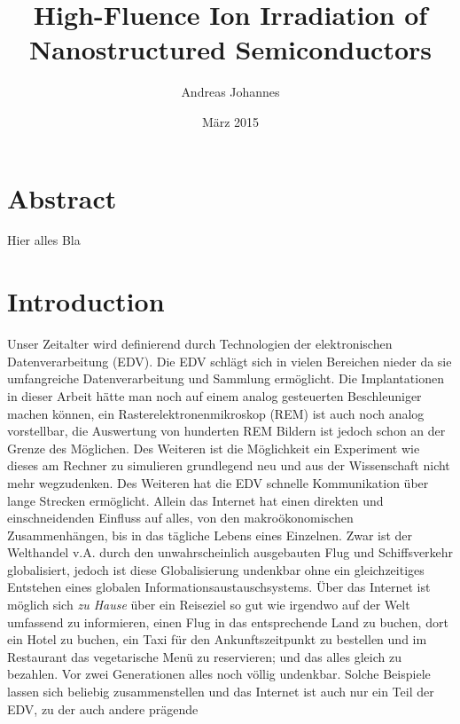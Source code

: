 \documentclass[11pt,
paper=a4,				
DIV=calc,		  %
headinclude,
]{scrbook}
\begin{document}
\titlehead{Friedrich Schiller Universität Jena\\
PAF}
\subject{Dissertation}
\title{High-Fluence Ion Irradiation of Nanostructured Semiconductors}
\author{Andreas Johannes}
\date{März 2015}
\maketitle



\chapter*{Abstract}

Hier alles Bla


\tableofcontents

\chapter{Introduction}


Unser Zeitalter wird definierend durch Technologien der elektronischen Datenverarbeitung (EDV). Die EDV schlägt sich in vielen Bereichen nieder da sie umfangreiche Datenverarbeitung und Sammlung ermöglicht. Die Implantationen in dieser Arbeit hätte man noch auf einem analog gesteuerten Beschleuniger machen können, ein Rasterelektronenmikroskop (REM) ist auch noch analog vorstellbar, die Auswertung von hunderten REM Bildern ist jedoch schon an der Grenze des Möglichen. Des Weiteren ist die Möglichkeit ein Experiment wie dieses am Rechner zu simulieren grundlegend neu und aus der Wissenschaft nicht mehr wegzudenken. Des Weiteren hat die EDV schnelle Kommunikation über lange Strecken ermöglicht. Allein das Internet hat einen direkten und einschneidenden Einfluss auf alles, von den makroökonomischen Zusammenhängen, bis in das tägliche Lebens eines Einzelnen. Zwar ist der Welthandel v.A. durch den unwahrscheinlich ausgebauten Flug und Schiffsverkehr globalisiert, jedoch ist diese Globalisierung undenkbar ohne ein gleichzeitiges Entstehen eines globalen Informationsaustauschsystems. Über das Internet ist möglich sich \emph{zu Hause} über ein Reiseziel so gut wie irgendwo auf der Welt umfassend zu informieren, einen Flug in das entsprechende Land zu buchen, dort ein Hotel zu buchen, ein Taxi für den Ankunftszeitpunkt zu bestellen und im Restaurant das vegetarische Menü zu reservieren; und das alles gleich zu bezahlen. Vor zwei Generationen alles noch völlig undenkbar. Solche Beispiele lassen sich beliebig zusammenstellen und das Internet ist auch nur ein Teil der EDV, zu der auch andere prägende 
\end{document}
